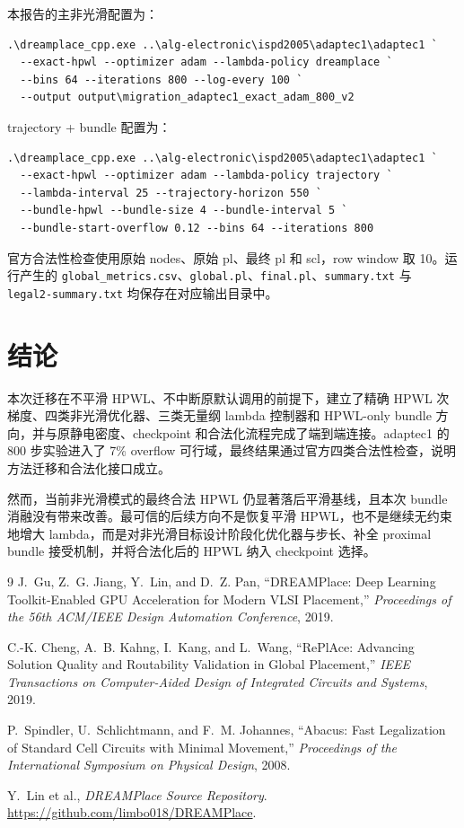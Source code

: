 \documentclass[UTF8,a4paper,11pt]{ctexart}
\begin{document}
本报告的主非光滑配置为：
\begin{lstlisting}[language={}]
.\dreamplace_cpp.exe ..\alg-electronic\ispd2005\adaptec1\adaptec1 `
  --exact-hpwl --optimizer adam --lambda-policy dreamplace `
  --bins 64 --iterations 800 --log-every 100 `
  --output output\migration_adaptec1_exact_adam_800_v2
\end{lstlisting}

trajectory + bundle 配置为：
\begin{lstlisting}[language={}]
.\dreamplace_cpp.exe ..\alg-electronic\ispd2005\adaptec1\adaptec1 `
  --exact-hpwl --optimizer adam --lambda-policy trajectory `
  --lambda-interval 25 --trajectory-horizon 550 `
  --bundle-hpwl --bundle-size 4 --bundle-interval 5 `
  --bundle-start-overflow 0.12 --bins 64 --iterations 800
\end{lstlisting}

官方合法性检查使用原始 nodes、原始 pl、最终 pl 和 scl，row window 取 10。运行产生的 \texttt{global\_metrics.csv}、\texttt{global.pl}、\texttt{final.pl}、\texttt{summary.txt} 与 \texttt{legal2-summary.txt} 均保存在对应输出目录中。

\section{结论}

本次迁移在不平滑 HPWL、不中断原默认调用的前提下，建立了精确 HPWL 次梯度、四类非光滑优化器、三类无量纲 lambda 控制器和 HPWL-only bundle 方向，并与原静电密度、checkpoint 和合法化流程完成了端到端连接。adaptec1 的 800 步实验进入了 7\% overflow 可行域，最终结果通过官方四类合法性检查，说明方法迁移和合法化接口成立。

然而，当前非光滑模式的最终合法 HPWL 仍显著落后平滑基线，且本次 bundle 消融没有带来改善。最可信的后续方向不是恢复平滑 HPWL，也不是继续无约束地增大 lambda，而是对非光滑目标设计阶段化优化器与步长、补全 proximal bundle 接受机制，并将合法化后的 HPWL 纳入 checkpoint 选择。

\begin{thebibliography}{9}
J.~Gu, Z.~G. Jiang, Y.~Lin, and D.~Z. Pan,
``DREAMPlace: Deep Learning Toolkit-Enabled GPU Acceleration for Modern VLSI Placement,''
\emph{Proceedings of the 56th ACM/IEEE Design Automation Conference}, 2019.

C.-K. Cheng, A.~B. Kahng, I.~Kang, and L.~Wang,
``RePlAce: Advancing Solution Quality and Routability Validation in Global Placement,''
\emph{IEEE Transactions on Computer-Aided Design of Integrated Circuits and Systems}, 2019.

P.~Spindler, U.~Schlichtmann, and F.~M. Johannes,
``Abacus: Fast Legalization of Standard Cell Circuits with Minimal Movement,''
\emph{Proceedings of the International Symposium on Physical Design}, 2008.

Y.~Lin et al., \emph{DREAMPlace Source Repository}.
\url{https://github.com/limbo018/DREAMPlace}.
\end{thebibliography}
\end{document}
